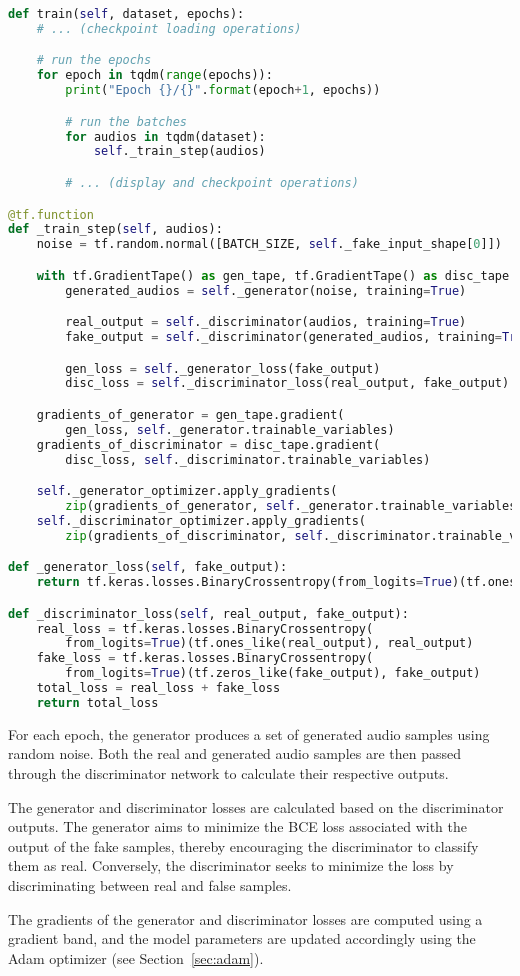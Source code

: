 \begin{lstlisting}[language=Python, caption={Training operations}]
def train(self, dataset, epochs):
    # ... (checkpoint loading operations)

    # run the epochs
    for epoch in tqdm(range(epochs)):
        print("Epoch {}/{}".format(epoch+1, epochs))

        # run the batches
        for audios in tqdm(dataset):
            self._train_step(audios)

        # ... (display and checkpoint operations)

@tf.function
def _train_step(self, audios):
    noise = tf.random.normal([BATCH_SIZE, self._fake_input_shape[0]])

    with tf.GradientTape() as gen_tape, tf.GradientTape() as disc_tape:
        generated_audios = self._generator(noise, training=True)

        real_output = self._discriminator(audios, training=True)
        fake_output = self._discriminator(generated_audios, training=True)

        gen_loss = self._generator_loss(fake_output)
        disc_loss = self._discriminator_loss(real_output, fake_output)

    gradients_of_generator = gen_tape.gradient(
        gen_loss, self._generator.trainable_variables)
    gradients_of_discriminator = disc_tape.gradient(
        disc_loss, self._discriminator.trainable_variables)

    self._generator_optimizer.apply_gradients(
        zip(gradients_of_generator, self._generator.trainable_variables))
    self._discriminator_optimizer.apply_gradients(
        zip(gradients_of_discriminator, self._discriminator.trainable_variables))

def _generator_loss(self, fake_output):
    return tf.keras.losses.BinaryCrossentropy(from_logits=True)(tf.ones_like(fake_output), fake_output)

def _discriminator_loss(self, real_output, fake_output):
    real_loss = tf.keras.losses.BinaryCrossentropy(
        from_logits=True)(tf.ones_like(real_output), real_output)
    fake_loss = tf.keras.losses.BinaryCrossentropy(
        from_logits=True)(tf.zeros_like(fake_output), fake_output)
    total_loss = real_loss + fake_loss
    return total_loss
\end{lstlisting}

For each epoch, the generator produces a set of generated audio samples using random noise. Both the real and generated audio samples are then passed through the discriminator network to calculate their respective outputs.

The generator and discriminator losses are calculated based on the discriminator outputs. The generator aims to minimize the \ac{BCE} loss associated with the output of the fake samples, thereby encouraging the discriminator to classify them as real. Conversely, the discriminator seeks to minimize the loss by discriminating between real and false samples.

The gradients of the generator and discriminator losses are computed using a gradient band, and the model parameters are updated accordingly using the Adam optimizer (see Section~\ref{sec:adam}).
